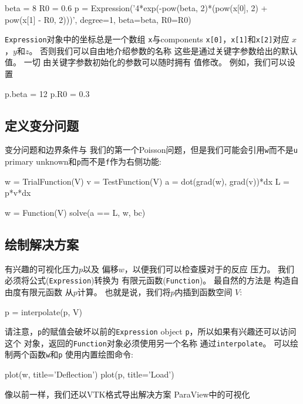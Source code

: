 \begin{python}
beta = 8
R0 = 0.6
p = Expression('4*exp(-pow(beta, 2)*(pow(x[0], 2) + pow(x[1] - R0, 2)))',
               degree=1, beta=beta, R0=R0)
\end{python}
\texttt{Expression}对象中的坐标总是一个数组
\texttt{x}与components \texttt{x[0]}，\texttt{x[1]}和\texttt{x[2]}对应
$x$，$y$和$z$。
否则我们可以自由地介绍参数的名称
这些是通过关键字参数给出的默认值。 一切
由关键字参数初始化的参数可以随时拥有
值修改。 例如，我们可以设置

\begin{python}
p.beta = 12
p.R0 = 0.3
\end{python}

\subsection{定义变分问题}

变分问题和边界条件与
我们的第一个Poisson问题，但是我们可能会引用\texttt{w}而不是\texttt{u}
primary unknown和\texttt{p}而不是\texttt{f}作为右侧功能:

\begin{python}
w = TrialFunction(V)
v = TestFunction(V)
a = dot(grad(w), grad(v))*dx
L = p*v*dx

w = Function(V)
solve(a == L, w, bc)
\end{python}

\subsection{绘制解决方案}

有兴趣的可视化压力$p$以及
偏移$w$，以便我们可以检查膜对于的反应
压力。 我们必须将公式(\texttt{Expression})转换为
有限元函数(\texttt{Function})。 最自然的方法是
构造自由度有限元函数
从$p$计算。 也就是说，我们将$p$内插到函数空间
$V$:

\begin{python}
p = interpolate(p, V)
\end{python}
请注意，\texttt{p}的赋值会破坏以前的\texttt{Expression}
object \texttt{p}，所以如果有兴趣还可以访问这个
对象，返回的\texttt{Function}对象必须使用另一个名称
通过\texttt{interpolate}。 可以绘制两个函数\texttt{w}和\texttt{p}
使用内置绘图命令:

\begin{python}
plot(w, title='Deflection')
plot(p, title='Load')
\end{python}
像以前一样，我们还以VTK格式导出解决方案
ParaView中的可视化

